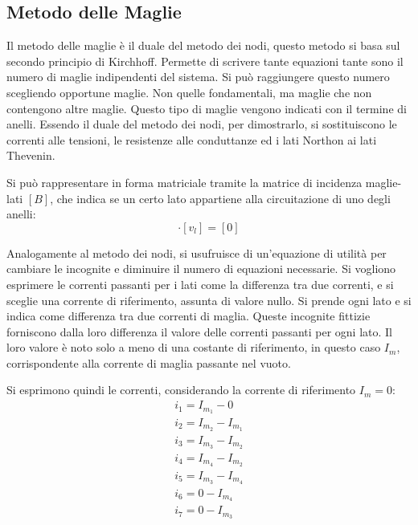 \documentclass{article}
\numberwithin{equation}{subsection}
\begin{document}
\subsection{Metodo delle Maglie}

Il metodo delle maglie è il duale del metodo dei nodi, questo metodo si basa sul secondo principio di Kirchhoff. Permette di scrivere tante equazioni tante sono il numero di 
maglie indipendenti del sistema. Si può raggiungere questo numero scegliendo opportune maglie. Non quelle fondamentali, ma maglie che non contengono altre maglie. Questo 
tipo di maglie vengono indicati con il termine di anelli. Essendo il duale del metodo dei nodi, per dimostrarlo, si sostituiscono le correnti alle tensioni, le resistenze alle 
conduttanze ed i lati Northon ai lati Thevenin. 

Si può rappresentare in forma matriciale tramite la matrice di incidenza maglie-lati $[B]$, che  indica se un certo lato appartiene alla circuitazione di uno degli anelli:
\begin{equation*}
    [B]\cdot[v_l]=[0]
\end{equation*}



Analogamente al metodo dei nodi, si usufruisce di un'equazione di utilità per cambiare le incognite e diminuire il numero di equazioni necessarie. Si vogliono esprimere 
le correnti passanti per i lati come la differenza tra due correnti, e si sceglie una corrente di riferimento, assunta di valore nullo. Si prende ogni lato e si indica come 
differenza tra due correnti di maglia. Queste incognite fittizie forniscono dalla loro differenza il valore delle correnti passanti per ogni lato. Il loro valore è noto 
solo a meno di una costante di riferimento, in questo caso $I_m$, corrispondente alla corrente di maglia passante nel vuoto. 


Si esprimono quindi le correnti, considerando la corrente di riferimento $I_m=0$: 
\begin{gather*}
    i_1=I_{m_1}-0\\
    i_2=I_{m_2}-I_{m_1}\\
    i_3=I_{m_3}-I_{m_2}\\
    i_4=I_{m_4}-I_{m_2}\\
    i_5=I_{m_3}-I_{m_4}\\
    i_6=0-I_{m_4}\\
    i_7=0-I_{m_3}
\end{gather*}
\end{document}
